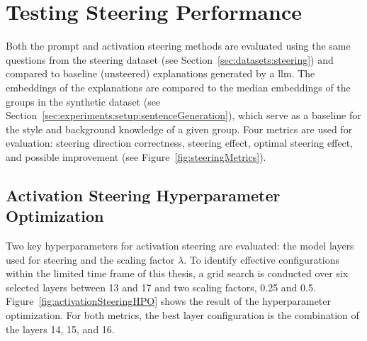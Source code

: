 \begin{table}[ht]
\begin{subtable}[t]{0.49\linewidth}
  \end{subtable}
  \hfill
  \begin{subtable}[t]{0.49\linewidth}
    \label{table:embedder:mediansForeignDomain}
    \resultEmbedderToMediansForeignDomain{}
  \end{subtable}
\end{table}

\section{Testing Steering Performance}%
\label{sec:evaluation:steering}

Both the prompt and activation steering methods are evaluated using the same questions from the steering dataset (see Section~\ref{sec:datasets:steering}) and compared to baseline (unsteered) explanations generated by a \acl{llm}. The embeddings of the explanations are compared to the median embeddings of the groups in the synthetic dataset (see Section~\ref{sec:experiments:setup:sentenceGeneration}), which serve as a baseline for the style and background knowledge of a given group. Four metrics are used for evaluation: steering direction correctness, steering effect, optimal steering effect, and possible improvement (see Figure~\ref{fig:steeringMetrics}).

\subsection{Activation Steering Hyperparameter Optimization}%
\label{sec:evaluation:steering:activationHPO}

Two key hyperparameters for activation steering are evaluated: the model layers used for steering and the scaling factor \(\lambda\). To identify effective configurations within the limited time frame of this thesis, a grid search is conducted over six selected layers between \num{13} and \num{17} and two scaling factors, \num{0.25} and \num{0.5}. Figure~\ref{fig:activationSteeringHPO} shows the result of the hyperparameter optimization. For both metrics, the best layer configuration is the combination of the layers \num{14}, \num{15}, and \num{16}.

